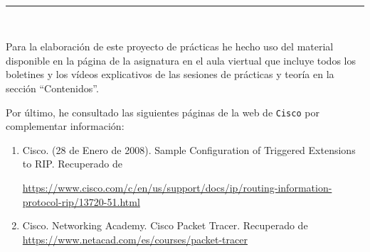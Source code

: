  \begin{center}
	{\fboxrule=4pt } \\
	\rule{15cm}{0pt} \\
\end{center}
\par Para la elaboración de este proyecto de prácticas he hecho uso del material disponible en la página de la asignatura en el aula viertual que incluye todos los boletines y los vídeos explicativos de las sesiones de prácticas y teoría en la sección ``Contenidos''.
\par Por último, he consultado las siguientes páginas de la web de \texttt{Cisco} por complementar información:
\begin{enumerate}
	\item Cisco. (28 de Enero de 2008). Sample Configuration of Triggered Extensions to RIP. Recuperado de 
	\raggedright\url{https://www.cisco.com/c/en/us/support/docs/ip/routing-information-protocol-rip/13720-51.html}
	\item Cisco. Networking Academy. Cisco Packet Tracer. Recuperado de 
	\url{https://www.netacad.com/es/courses/packet-tracer}
\end{enumerate}

